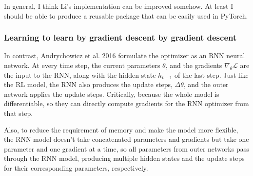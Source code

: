 In general, I think Li's implementation can be improved somehow. 
At least I should be able to produce a reusable package that can be easily used in PyTorch.

\subsubsection{Learning to learn by gradient descent by gradient descent}
In contrast, Andrychowicz et al. 2016\cite{andrychowicz2016learning} formulate the optimizer as an RNN neural network.
At every time step, the current parameters $\theta$, and the gradients $\nabla_\theta \mathcal{L}$ are the input to the RNN, along with the hidden state $h_{t-1}$ of the last step.
Just like the RL model, the RNN also produces the update steps, $\Delta \theta$, and the outer network applies the update steps.
Critically, because the whole model is differentiable, so they can directly compute gradients for the RNN optimizer from that step.

Also, to reduce the requirement of memory and make the model more flexible, the RNN model doesn't take concatenated parameters and gradients but take one parameter and one gradient at a time, so all parameters from outer networks pass through the RNN model, producing multiple hidden states and the update steps for their corresponding parameters, respectively.







